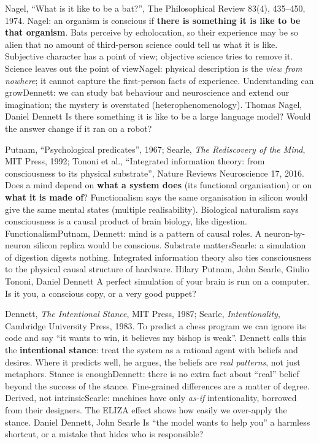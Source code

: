 {Nagel, ``What is it like to be a bat?'', The Philosophical Review 83(4), 435--450, 1974.}
{Nagel: an organism is conscious if \textbf{there is something it is like to be that organism}. Bats perceive by echolocation, so their experience may be so alien that no amount of third-person science could tell us what it is like. Subjective character has a point of view; objective science tries to remove it.}
{Science leaves out the point of view}{Nagel: physical description is the \emph{view from nowhere}; it cannot capture the first-person facts of experience.}
{Understanding can grow}{Dennett: we can study bat behaviour and neuroscience and extend our imagination; the mystery is overstated (heterophenomenology).}
{Thomas Nagel, Daniel Dennett}
{Is there something it is like to be a large language model? Would the answer change if it ran on a robot?}

{Putnam, ``Psychological predicates'', 1967; Searle, \emph{The Rediscovery of the Mind}, MIT Press, 1992; Tononi et al., ``Integrated information theory: from consciousness to its physical substrate'', Nature Reviews Neuroscience 17, 2016.}
{Does a mind depend on \textbf{what a system does} (its functional organisation) or on \textbf{what it is made of}? Functionalism says the same organisation in silicon would give the same mental states (multiple realisability). Biological naturalism says consciousness is a causal product of brain biology, like digestion.}
{Functionalism}{Putnam, Dennett: mind is a pattern of causal roles. A neuron-by-neuron silicon replica would be conscious.}
{Substrate matters}{Searle: a simulation of digestion digests nothing. Integrated information theory also ties consciousness to the physical causal structure of hardware.}
{Hilary Putnam, John Searle, Giulio Tononi, Daniel Dennett}
{A perfect simulation of your brain is run on a computer. Is it you, a conscious copy, or a very good puppet?}

{Dennett, \emph{The Intentional Stance}, MIT Press, 1987; Searle, \emph{Intentionality}, Cambridge University Press, 1983.}
{To predict a chess program we can ignore its code and say ``it wants to win, it believes my bishop is weak''. Dennett calls this the \textbf{intentional stance}: treat the system as a rational agent with beliefs and desires. Where it predicts well, he argues, the beliefs are \emph{real patterns}, not just metaphors.}
{Stance is enough}{Dennett: there is no extra fact about ``real'' belief beyond the success of the stance. Fine-grained differences are a matter of degree.}
{Derived, not intrinsic}{Searle: machines have only \emph{as-if} intentionality, borrowed from their designers. The ELIZA effect shows how easily we over-apply the stance.}
{Daniel Dennett, John Searle}
{Is ``the model wants to help you'' a harmless shortcut, or a mistake that hides who is responsible?}

